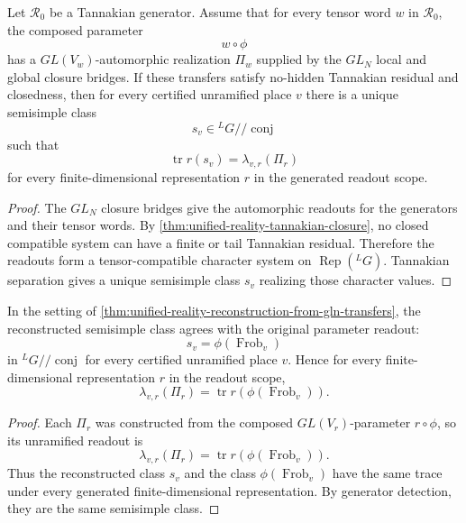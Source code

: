 \begin{theorem}
\label{thm:unified-reality-reconstruction-from-gln-transfers}
Let $\mathcal R_0$ be a Tannakian generator. Assume that for every
tensor word $w$ in $\mathcal R_0$, the composed parameter
$$
w\circ\phi
$$
has a $GL(V_w)$-automorphic realization $\Pi_w$ supplied by the
$GL_N$ local and global closure bridges. If these transfers satisfy
no-hidden Tannakian residual and closedness, then for every certified
unramified place $v$ there is a unique semisimple class
$$
s_v\in{}^LG/\!/\operatorname{conj}
$$
such that
$$
\operatorname{tr}r(s_v)=\lambda_{v,r}(\Pi_r)
$$
for every finite-dimensional representation $r$ in the generated
readout scope.
\end{theorem}
\begin{proof}
The $GL_N$ closure bridges give the automorphic readouts for the
generators and their tensor words. By
\autoref{thm:unified-reality-tannakian-closure}, no closed compatible
system can have a finite or tail Tannakian residual. Therefore the
readouts form a tensor-compatible character system on
$\operatorname{Rep}({}^LG)$. Tannakian separation gives a unique
semisimple class $s_v$ realizing those character values.
\end{proof}

\begin{theorem}
\label{thm:unified-reality-general-g-finite-readout-closure}
In the setting of
\autoref{thm:unified-reality-reconstruction-from-gln-transfers}, the
reconstructed semisimple class agrees with the original parameter
readout:
$$
s_v=\phi(\operatorname{Frob}_v)
$$
in ${}^LG/\!/\operatorname{conj}$ for every certified unramified place
$v$. Hence for every finite-dimensional representation $r$ in the
readout scope,
$$
\lambda_{v,r}(\Pi_r)
=
\operatorname{tr}r(\phi(\operatorname{Frob}_v)).
$$
\end{theorem}
\begin{proof}
Each $\Pi_r$ was constructed from the composed $GL(V_r)$-parameter
$r\circ\phi$, so its unramified readout is
$$
\lambda_{v,r}(\Pi_r)
=
\operatorname{tr}r(\phi(\operatorname{Frob}_v)).
$$
Thus the reconstructed class $s_v$ and the class
$\phi(\operatorname{Frob}_v)$ have the same trace under every generated
finite-dimensional representation. By generator detection, they are the
same semisimple class.
\end{proof}

